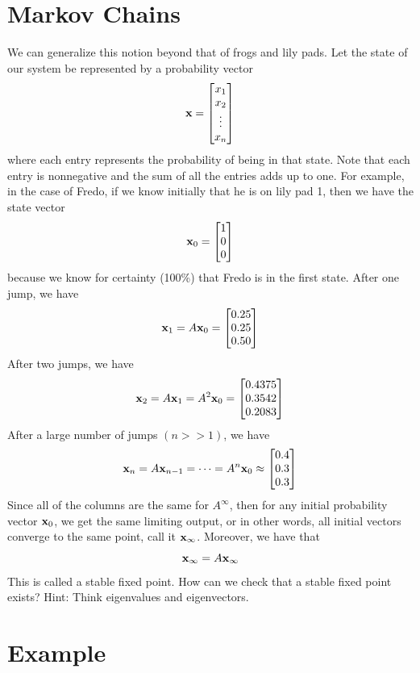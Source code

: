 \section*{Markov Chains}

We can generalize this notion beyond that of frogs and lily pads.
Let the state of our system be represented by a probability vector
\[
{\bf x} = \begin{bmatrix}
x_1\\
x_2\\
\vdots\\
x_n
\end{bmatrix}
\]
where each entry represents the probability of being in that state.
Note that each entry is nonnegative and the sum of all the entries adds up to one.
For example, in the case of Fredo, if we know initially that he is on lily pad 1, then we have the state vector
\[
{\bf x}_0 = \begin{bmatrix}
1\\
0\\
0
\end{bmatrix}
\]
because we know for certainty (100\%) that Fredo is in the first state.
After one jump, we have
\[
{\bf x}_1 = A {\bf x}_0 = \begin{bmatrix}
0.25\\
0.25\\
0.50
\end{bmatrix}
\]
After two jumps, we have
\[
{\bf x}_2 = A {\bf x}_1 = A^2 {\bf x}_0 = \begin{bmatrix}
0.4375\\
0.3542\\
0.2083
\end{bmatrix}
\]
After a large number of jumps $(n>>1)$, we have
\[
{\bf x}_n = A {\bf x}_{n-1} = \dots = A^n {\bf x}_0 \approx \begin{bmatrix}
0.4\\
0.3\\
0.3
\end{bmatrix}
\]
Since all of the columns are the same for $A^\infty$, then for any initial probability vector ${\bf x}_0$, we get the same limiting output, or in other words, all initial vectors converge to the same point, call it ${\bf x}_\infty$.
Moreover, we have that
\[
{\bf x}_\infty = A {\bf x}_\infty
\]
This is called a stable fixed point.
How can we check that a stable fixed point exists?
Hint: Think eigenvalues and eigenvectors.

\section*{Example}

